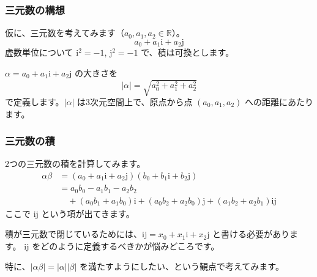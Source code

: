 \documentclass{beamer}
\newcommand{\ii}{\mathrm{i}}
\newcommand{\jj}{\mathrm{j}}
\begin{document}
\begin{frame}
    \frametitle{三元数の構想}

    仮に、三元数を考えてみます（\(a_0, a_1, a_2 \in \mathbb{R}\)）。
    \[
        a_0 + a_1 \ii + a_2 \jj
    \]
    虚数単位について \(\ii^2 = -1\), \(\jj^2 = -1\) で、積は可換とします。

    \bigskip

    \(\alpha = a_0 + a_1 \ii + a_2 \jj\) の大きさを
    \[
        |\alpha| = \sqrt{a_0^2 + a_1^2 + a_2^2}
    \]
    で定義します。\(|\alpha|\) は3次元空間上で、原点から点 \((a_0, a_1, a_2)\) への距離にあたります。
\end{frame}

\begin{frame}
    \frametitle{三元数の積}

    2つの三元数の積を計算してみます。
    \begin{align*}
        \alpha \beta & = (a_0 + a_1 \ii + a_2 \jj) (b_0 + b_1 \ii + b_2 \jj)                                   \\
                     & = a_0 b_0 - a_1 b_1 - a_2 b_2                                                           \\
                     & \quad + (a_0 b_1 + a_1 b_0) \ii + (a_0 b_2 + a_2 b_0) \jj + (a_1 b_2 + a_2 b_1) \ii \jj
    \end{align*}
    ここで \(\ii \jj\) という項が出てきます。

    \bigskip

    積が三元数で閉じているためには、\(\ii \jj = x_0 + x_1 \ii + x_2 \jj\) と書ける必要があります。
    \(\ii \jj\) をどのように定義するべきかが悩みどころです。

    \bigskip

    特に、\(|\alpha \beta| = |\alpha| |\beta|\) を満たすようにしたい、という観点で考えてみます。
\end{frame}
\end{document}
